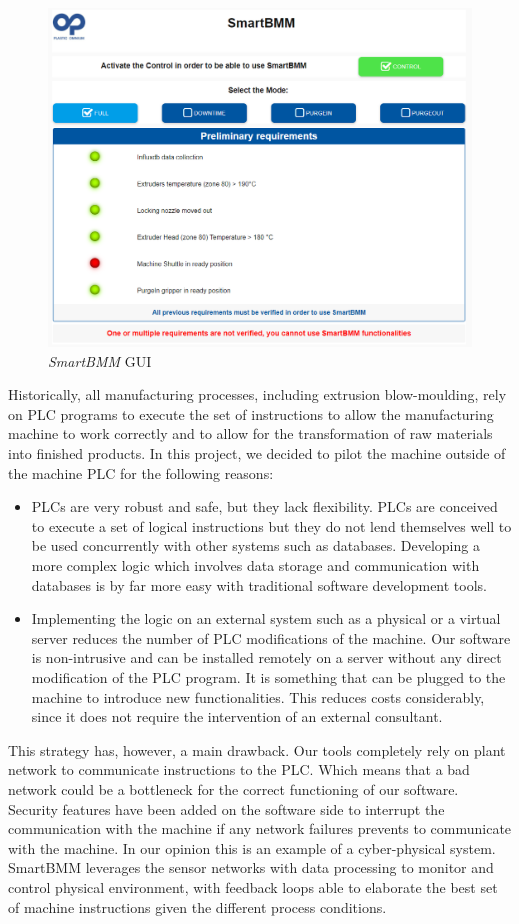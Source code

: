 %
\begin{figure}
\centerline{\includegraphics[scale=0.5]{images/chapter_3/SmartBMM_gui.png}}
\caption{\textit{SmartBMM} GUI}
\label{fig:SmartBMM_gui}
\end{figure}
%
Historically, all manufacturing processes, including extrusion  blow-moulding, rely on PLC programs to execute the set of instructions to allow the manufacturing machine to work correctly and to allow for the transformation of raw materials into finished products. In this project, we decided to pilot the machine outside of the machine PLC for the following reasons:
%
\begin{itemize}
    \item PLCs are very robust and safe, but they lack flexibility. PLCs are conceived to execute a set of logical instructions but they do not lend themselves well to be used concurrently with other systems such as databases. Developing a more complex logic which involves data storage and communication with databases is by far more easy with traditional software development tools.
    \item Implementing the logic on an external system such as a physical or a virtual server reduces the number of PLC modifications of the machine. Our software is  non-intrusive and can be installed remotely on a server without any direct modification of the PLC program. It is something that can be plugged to the machine to introduce new functionalities. This reduces costs considerably, since it does not require the intervention of an external consultant.
\end{itemize}
%
This strategy has, however, a main drawback. Our tools completely rely on plant network to communicate instructions to the PLC. Which means that a bad network could be a bottleneck for the correct functioning of our software. Security features have been added on the software side to interrupt the communication with the machine if any network failures prevents to communicate with the machine.
In our opinion this is an example of a cyber-physical system. SmartBMM leverages the sensor networks with data processing to monitor and control physical environment, with feedback loops able to elaborate the best set of machine instructions given the different process conditions.


